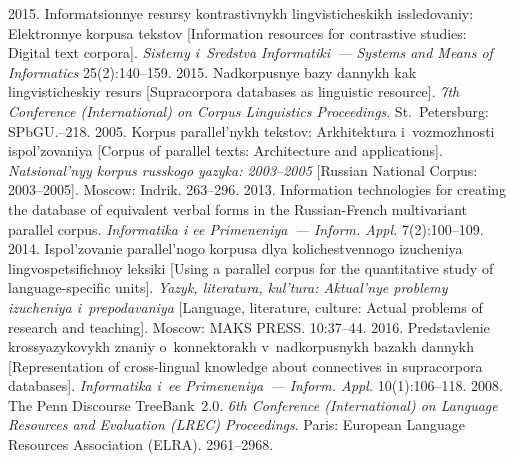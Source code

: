 \begin{multicols}{2}
{{\begin{thebibliography}{99}
 2015. Informatsionnye resursy kontrastivnykh 
lingvisticheskikh issledovaniy: Elektronnye korpusa tekstov [Information 
resources for contrastive studies: Digital text corpora]. \textit{Sistemy 
i~Sredstva Informatiki~--- Systems and Means of Informatics}  
25(2):140--159.
 2015. Nadkorpusnye bazy dannykh kak lingvisticheskiy 
resurs [Supracorpora databases as linguistic resource]. \textit{7th Conference 
(International) on Corpus Linguistics Proceedings}. St.\ Petersburg: SPbGU.--218.
 2005. Korpus 
parallel'nykh tekstov: Arkhitektura i~voz\-mozh\-nosti ispol'zovaniya [Corpus of 
parallel texts: Architecture and applications]. \textit{Natsional'nyy korpus 
russkogo yazyka: 2003--2005} [Russian National Corpus: 2003--2005]. 
Moscow: Indrik. 263--296.
 2013. Information technologies for creating the database of 
equivalent verbal forms in the Russian-French multivariant parallel corpus. 
\textit{Informatika i ee Primeneniya~--- Inform. Appl.} 7(2):100--109.
 2014. Ispol'zovanie parallel'nogo korpusa dlya 
kolichestvennogo izucheniya lingvospetsifichnoy leksiki [Using a parallel 
corpus for the quantitative study of language-specific units]. \textit{Yazyk, 
literatura, kul'tura: Aktual'nye problemy izucheniya i~prepodavaniya} 
[Language, literature, culture: Actual problems of research and teaching]. 
Moscow: MAKS PRESS. 10:37--44.
 2016. Predstavlenie krossyazykovykh znaniy 
o~konnektorakh v~nadkorpusnykh bazakh dannykh [Representation of  
cross-lingual knowledge about connectives in supracorpora databases]. 
\textit{Informatika i~ee Primeneniya~--- Inform. Appl.} 10(1):106--118.
 2008. The Penn Discourse TreeBank~2.0. \textit{6th 
Conference (International) on Language Resources and Evaluation (LREC) 
Proceedings}. Paris: European Language Resources Association (ELRA). 
2961--2968.


\end{thebibliography}}}
\end{multicols}
